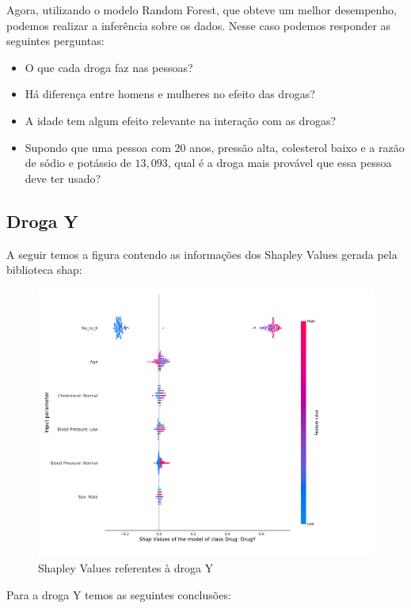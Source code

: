 \documentclass[12pt,a4paper]{article}
\theoremstyle{definition}
\theoremstyle{theoremdd}
\begin{document}
Agora, utilizando o modelo Random Forest, que obteve um melhor desempenho, podemos realizar a inferência sobre os dados. Nesse caso podemos responder as seguintes perguntas:
\begin{itemize}
\item O que cada droga faz nas pessoas?
\item Há diferença entre homens e mulheres no efeito das drogas?
\item A idade tem algum efeito relevante na interação com as drogas?
\item Supondo que uma pessoa com $20$ anos, pressão alta, colesterol baixo e a razão de sódio e potássio de $13,093$, qual é a droga mais provável que essa pessoa deve ter usado?
\end{itemize}

\subsection{Droga Y}

A seguir temos a figura contendo as informações dos Shapley Values gerada pela biblioteca shap:
\begin{center}
\begin{figure}[H]
	\centering
	\includegraphics[scale=.40]{shap_drugY.pdf}
	\caption{Shapley Values referentes à droga Y}
	\label{fig:03}
\end{figure}
\end{center}

Para a droga Y temos as seguintes conclusões:
\end{document}
